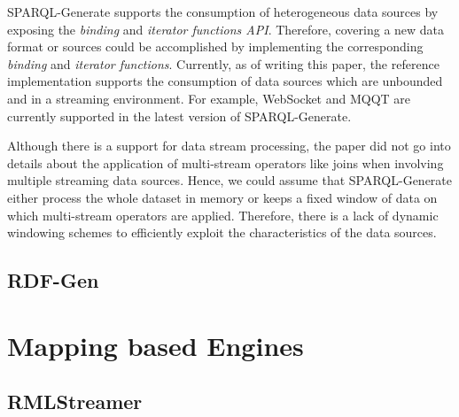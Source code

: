 SPARQL-Generate supports the consumption of heterogeneous data sources by exposing the 
\emph{binding} and \emph{iterator functions API}. Therefore, covering a new data format or sources could be accomplished 
by implementing the corresponding \emph{binding} and \emph{iterator functions}. Currently, as of writing this paper, 
the reference implementation supports the consumption of data sources which are unbounded and in a streaming environment. 
For example, WebSocket and MQQT are currently supported in the latest version of SPARQL-Generate. 

Although there is a support for data stream processing, the paper did not go into details 
about the application of multi-stream operators like joins when involving multiple streaming 
data sources. Hence, we could assume that SPARQL-Generate either process the whole dataset in memory or 
keeps a fixed window of data on which multi-stream operators are applied. Therefore, there is a lack of  
dynamic windowing schemes to efficiently exploit the characteristics of the data sources.  



\subsection{RDF-Gen}


\section{Mapping based Engines}

\subsection{RMLStreamer}
